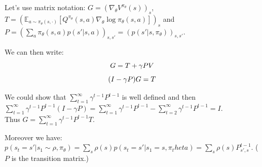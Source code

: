 \documentclass[a4paper]{article}
\begin{document}
Let's use matrix notation: $G = (\nabla_\theta V^{\pi_\theta}(s))_s$,
$T = \left(\mathbb{E}_{a \sim \pi_\theta(s, \cdot)}[Q^{\pi_\theta}(s, a) \nabla_\theta \log \pi_\theta(s, a)]\right)_s$ and\\
$P = \left(\sum_a \pi_\theta(s, a) p(s'|s, a) \right)_{s, s'} = (p(s'| s, \pi_\theta))_{s, s'}$.
\vspace{10px}

We can then write:
\begin{equation*}
    G = T + \gamma PV\\
\end{equation*}
\begin{equation*}
    (I - \gamma P)G = T\\
\end{equation*}
\vspace{10px}

We could show that $\sum_{t=1}^\infty \gamma^{t-1} P^{t-1}$ is well defined and then\\
$\sum_{t=1}^\infty \gamma^{t-1} P^{t-1} (I - \gamma P) = \sum_{t=1}^\infty \gamma^{t-1} P^{t-1} - \sum_{t=2}^\infty \gamma^{t-1} P^{t-1} = I$.\\
Thus $G = \sum_{t=1}^\infty \gamma^{t-1} P^{t-1} T$.
\vspace{10px}

Moreover we have: $p(s_t = s' | s_1 \sim \rho, \pi_\theta) = \sum_s \rho(s) p(s_t = s' | s_1 = s, \pi_theta) = \sum_s \rho(s) P^{t-1}_{s', s}$.
($P$ is the transition matrix.)
\end{document}
